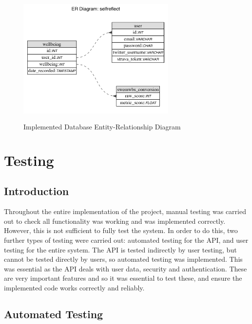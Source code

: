 \documentclass[11pt,openright,a4paper]{report}
\begin{document}
\begin{figure}[ht]
\centering
\caption{Implemented Database Entity-Relationship Diagram}
\includegraphics[width=0.7\textwidth]{i/dberdimpl.png}
\label{fig:dberdimpl}
\end{figure}

\chapter{Testing}
\section{Introduction}
Throughout the entire implementation of the project, manual testing was carried out to check all functionality was working and was implemented correctly. However, this is not sufficient to fully test the system. In order to do this, two further types of testing were carried out: automated testing for the API, and user testing for the entire system. The API is tested indirectly by user testing, but cannot be tested directly by users, so automated testing was implemented. This was essential as the API deals with user data, security and authentication. These are very important features and so it was essential to test these, and ensure the implemented code works correctly and reliably.

\section{Automated Testing}
\end{document}

